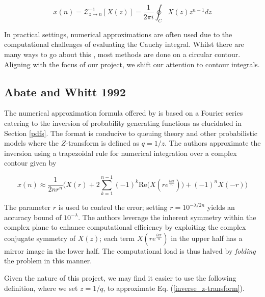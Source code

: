 \documentclass[a4paper]{report}
\begin{document}
\begin{equation}\label{inverse_z-transform}
	x(n) = \mathcal{Z}^{-1}_{z \rightarrow n}[X(z)] = \frac{1}{2\pi i} \oint_C X(z)z^{n-1}dz
\end{equation}

In practical settings, numerical approximations are often used due to the computational challenges of evaluating the Cauchy integral. Whilst there are many ways to go about this \citep{merrikh2014linearsys,rajkovic2004method,horvath2020numerical}, most methods are done on a circular contour. Aligning with the focus of our project, we shift our attention to contour integrals.


\subsection{Abate and Whitt 1992}\label{abate_whitt_section}
The numerical approximation formula offered by \citet{AbateWhitt1992a, AbateWhitt1992b} is based on a Fourier series catering to the inversion of probability generating functions as elucidated in Section \ref{pdfs}. The format is conducive to queuing theory and other probabilistic models where the $Z$-transform is defined as $q = 1 / z$. The authors approximate the inversion using a trapezoidal rule for numerical integration over a complex contour given by

\begin{equation}\label{aw_inversion_original}
	x(n) \approx \frac{1}{2nr^n} \biggr( X(r) + 2\sum^{n-1}_{k = 1} (-1)^k \mathrm{Re}\bigg( X(re^{\frac{ik\pi}{n}})\bigg) + (-1)^nX(-r) \biggl)
\end{equation}

The parameter $r$ is used to control the error; setting $r = 10^{-\lambda / 2n}$ yields an accuracy bound of $10^{-\lambda}$. The authors leverage the inherent symmetry within the complex plane to enhance computational efficiency by exploiting the complex conjugate symmetry of $X(z)$; each term $X(re^{\frac{ik\pi}{n}})$ in the upper half has a mirror image in the lower half. The computational load is thus halved by \textit{folding} the problem in this manner.

Given the nature of this project, we may find it easier to use the following definition, where we set $z = 1 / q$, to approximate Eq. (\ref{inverse_z-transform}).
\end{document}

